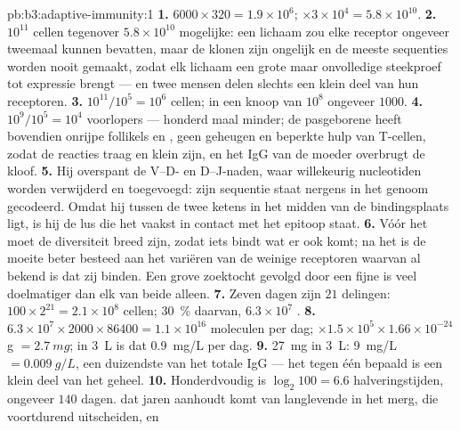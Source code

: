 \begin{solution}{pb:b3:adaptive-immunity:1}
\textbf{1.} $6000\times 320 = 1.9\times 10^{6}$; $\times 3\times 10^{4}
= 5.8\times 10^{10}$.
\textbf{2.} $10^{11}$ cellen tegenover $5.8\times 10^{10}$ mogelijke:
een lichaam zou elke receptor ongeveer tweemaal kunnen bevatten, maar
de klonen zijn ongelijk en de meeste sequenties worden nooit gemaakt,
zodat elk lichaam een grote maar onvolledige steekproef tot expressie
brengt --- en twee mensen delen slechts een klein deel van hun
receptoren.
\textbf{3.} $10^{11}/10^{5} = 10^{6}$ cellen; in een knoop van
$10^{8}$ ongeveer $1000$.
\textbf{4.} $10^{9}/10^{5} = 10^{4}$ voorlopers --- honderd maal
minder; de pasgeborene heeft bovendien onrijpe follikels en
, geen geheugen en beperkte hulp van T-cellen, zodat
de reacties traag en klein zijn, en het IgG van de moeder overbrugt de
kloof.
\textbf{5.} Hij overspant de V--D- en D--J-naden, waar willekeurig
nucleotiden worden verwijderd en toegevoegd: zijn sequentie staat
nergens in het genoom gecodeerd. Omdat hij tussen de twee ketens in het
midden van de bindingsplaats ligt, is hij de lus die het vaakst in
contact met het epitoop staat.
\textbf{6.} Vóór het  moet de diversiteit breed zijn, zodat
iets bindt wat er ook komt; na het  is de moeite beter besteed
aan het variëren van de weinige receptoren waarvan al bekend is dat zij
binden. Een grove zoektocht gevolgd door een fijne is veel doelmatiger
dan elk van beide alleen.
\textbf{7.} Zeven dagen zijn $21$ delingen: $100\times 2^{21} = 2.1\times
10^{8}$ cellen; \qty{30}{\%} daarvan, $6.3\times 10^{7}$ .
\textbf{8.} $6.3\times 10^{7}\times 2000\times \num{86400} = 1.1\times
10^{16}$ moleculen per dag; $\times 1.5\times 10^{5}\times 1.66\times
10^{-24}$ g $= \qty{2.7}{mg}$; in \qty{3}{L} is dat \qty{0.9}{mg/L} per
dag.
\textbf{9.} \qty{27}{mg} in \qty{3}{L}: \qty{9}{mg/L} $= \qty{0.009}{g/L}$,
een duizendste van het totale IgG --- het  tegen één bepaald
 is een klein deel van het geheel.
\textbf{10.} Honderdvoudig is $\log_{2}100 = 6.6$ halveringstijden,
ongeveer $140$ dagen.  dat jaren aanhoudt komt van
langlevende  in het merg, die voortdurend uitscheiden, en

\end{solution}
